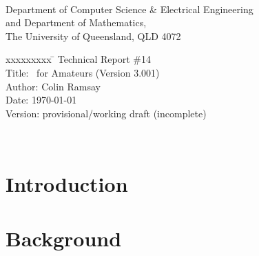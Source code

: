 \documentclass[12pt,a4paper,twoside]{report}
\begin{document}
\pagestyle{empty}

\begin{center}\large
{} \\[2.0ex]
Department of Computer Science {\normalsize\&} Electrical Engineering \\
and Department of Mathematics, \\
The University of Queensland, QLD 4072
\end{center}

\vspace*{3.5in}

\begin{center}\large
{\parbox{75mm}{\begin{tabbing}
xxxxxxxxx \= \kill
         \> Technical Report \#14 \\[2.25ex]
Title:   \> \ace\ for Amateurs (Version 3.001) \\[0.75ex]
Author:  \> Colin Ramsay \\
Date:    \> \today \\
Version: \> provisional/working draft (incomplete)
\end{tabbing}}}
\end{center}


\newpage
\pagestyle{plain}
\setcounter{page}{2}

\ 


\newpage

\tableofcontents

\newpage
{}
\listoffigures

\newpage
{}
\listoftables


\newpage
\setcounter{page}{1}

\chapter{Introduction}



\chapter{Background}

\end{document}
